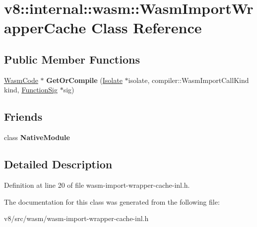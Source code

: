\hypertarget{classv8_1_1internal_1_1wasm_1_1WasmImportWrapperCache}{}\section{v8\+:\+:internal\+:\+:wasm\+:\+:Wasm\+Import\+Wrapper\+Cache Class Reference}
\label{classv8_1_1internal_1_1wasm_1_1WasmImportWrapperCache}
\subsection*{Public Member Functions}
\begin{DoxyCompactItemize}
\item 
\mbox{\label{classv8_1_1internal_1_1wasm_1_1WasmImportWrapperCache_ac168126acaa516afb176b477283b7592}} 
\mbox{\hyperlink{classv8_1_1internal_1_1wasm_1_1WasmCode}{Wasm\+Code}} $\ast$ {\bfseries Get\+Or\+Compile} (\mbox{\hyperlink{classv8_1_1internal_1_1Isolate}{Isolate}} $\ast$isolate, compiler\+::\+Wasm\+Import\+Call\+Kind kind, \mbox{\hyperlink{classv8_1_1internal_1_1Signature}{Function\+Sig}} $\ast$sig)
\end{DoxyCompactItemize}
\subsection*{Friends}
\begin{DoxyCompactItemize}
\item 
\mbox{\label{classv8_1_1internal_1_1wasm_1_1WasmImportWrapperCache_ab2eba8bcd9cf5215e8ce842fad93a987}} 
class {\bfseries Native\+Module}
\end{DoxyCompactItemize}


\subsection{Detailed Description}


Definition at line 20 of file wasm-\/import-\/wrapper-\/cache-\/inl.\+h.



The documentation for this class was generated from the following file\+:\begin{DoxyCompactItemize}
\item 
v8/src/wasm/wasm-\/import-\/wrapper-\/cache-\/inl.\+h\end{DoxyCompactItemize}
